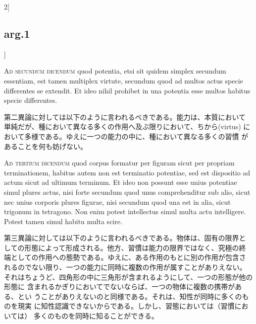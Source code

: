 \documentclass[paper=a4paper,fontsize=10pt,jafontsize=9pt,titlepage]{jlreq}
\begin{document}
\begin{paracol}{2}[\subsection{arg.1}]
\switchcolumn*[\subsection{ad.2}]

{\scshape Ad secundum dicendum} quod potentia, etsi sit quidem simplex secundum
essentiam, est tamen multiplex virtute, secundum quod ad multos actus
specie differentes se extendit. Et ideo nihil prohibet in una potentia
esse multos habitus specie differentes.

\switchcolumn

第二異論に対しては以下のように言われるべきである。能力は、本質において
単純だが、種において異なる多くの作用へ及ぶ限りにおいて、ちから(virtus)
において多様である。ゆえに一つの能力の中に、種において異なる多くの習慣
があることを何も妨げない。

\switchcolumn*[\subsection{ad.3}]

{\scshape Ad tertium dicendum} quod corpus formatur per figuram sicut
per propriam terminationem, habitus autem non est terminatio
potentiae, sed est dispositio ad actum sicut ad ultimum terminum. Et
ideo non possunt esse unius potentiae simul plures actus, nisi forte
secundum quod unus comprehenditur sub alio, sicut nec unius corporis
plures figurae, nisi secundum quod una est in alia, sicut trigonum in
tetragono. Non enim potest intellectus simul multa actu
intelligere. Potest tamen simul habitu multa scire.

\switchcolumn

第三異論に対しては以下のように言われるべきである。物体は、固有の限界と
しての形態によって形成される。他方、習慣は能力の限界ではなく、究極の終
端としての作用への態勢である。ゆえに、ある作用のもとに別の作用が包含さ
れるのでない限り、一つの能力に同時に複数の作用が属すことがありえない。
それはちょうど、四角形の中に三角形が含まれるようにして、一つの形態が他の形態に
含まれるかぎりにおいてでないならば、一つの物体に複数の携帯がある、とい
うことがありえないのと同様である。それは、知性が同時に多くのものを現実
に知性認識できないからである。しかし、習態においては（習慣においては）
多くのものを同時に知ることができる。

\end{paracol}
\newpage
{}
{}
\setcounter{section}{2}
\setcounter{subsection}{0}
\end{document}
